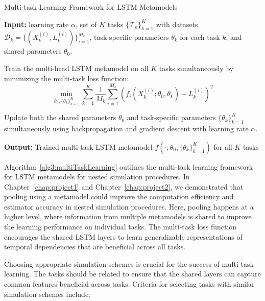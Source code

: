 \begin{algorithm}
    \caption{Multi-task Learning Framework for LSTM Metamodels}
    \begin{algorithmic}[1] \label{alg3:multiTaskLearning}
        \STATE \textbf{Input:} learning rate $\alpha$, set of $K$ tasks $\{\mathcal{T}_k\}_{k=1}^K$ with datasets $\mathcal{D}_k = \{(X_k^{(i)}, L_k^{(i)})\}_{i=1}^{M_k}$, task-specific parameters $\theta_k$ for each task $k$, and shared parameters $\theta_0$.
    
        \STATE Train the multi-head LSTM metamodel on all $K$ tasks simultaneously by minimizing the multi-task loss function:
        \begin{equation} \label{eq3:multiTaskLoss}
            \min_{\theta_0, \{\theta_k\}_{k=1}^K} \sum_{k=1}^K \frac{1}{M_k} \sum_{i=1}^{M_k} \left( f_i(X_k^{(i)}; \theta_0, \theta_k) - L_k^{(i)} \right)^2
        \end{equation}
    
        \STATE Update both the shared parameters $\theta_0$ and task-specific parameters $\{\theta_k\}_{k=1}^K$ simultaneously using backpropagation and gradient descent with learning rate $\alpha$.
        
        \STATE \textbf{Output:} Trained multi-task LSTM metamodel $f(\cdot; \theta_0, \{\theta_k\}_{k=1}^K)$ for all $K$ tasks
    \end{algorithmic}
\end{algorithm}

Algorithm~\ref{alg3:multiTaskLearning} outlines the multi-task learning framework for LSTM metamodels for nested simulation procedures.
In Chapter~\ref{chap:project1} and Chapter~\ref{chap:project2}, we demonstrated that pooling using a metamodel could improve the computation efficiency and estimator accuracy in nested simulation procedures.
Here, pooling happens at a higher level, where information from multiple metamodels is shared to improve the learning performance on individual tasks.
The multi-task loss function encourages the shared LSTM layers to learn generalizable representations of temporal dependencies that are beneficial across all tasks.

Choosing appropriate simulation schemes is crucial for the success of multi-task learning. 
The tasks should be related to ensure that the shared layers can capture common features beneficial across tasks. 
Criteria for selecting tasks with similar simulation schemes include:

